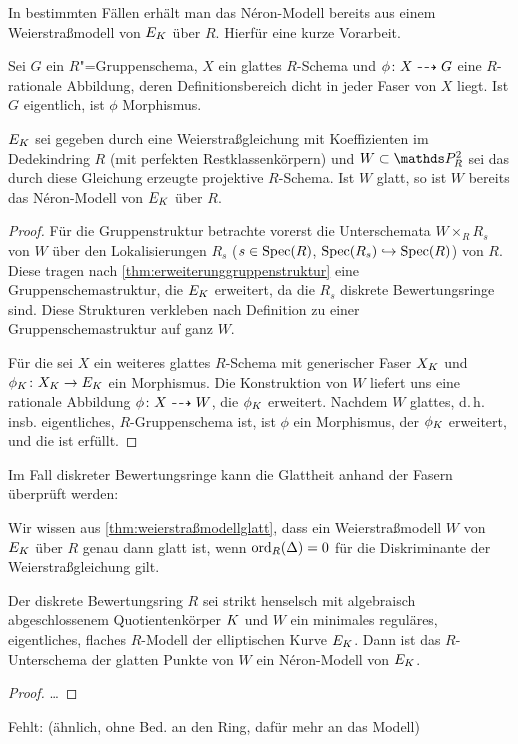 \documentclass[german]{scrreprt}
\begin{document}
In bestimmten Fällen erhält man das Néron-Modell bereits aus einem
Weierstraßmodell von $E_{K}$ über $R$. Hierfür eine kurze Vorarbeit.
\begin{Lemma}\label{thm:rationalzumorphismus}
  Sei $G$ ein $R$"=Gruppenschema, $X$ ein glattes $R$-Schema und
  $\phi\colon X\dashrightarrow G$ eine $R$-rationale Abbildung, deren
  Definitionsbereich dicht in jeder Faser von $X$ liegt.
  Ist $G$ eigentlich, ist $\phi$ Morphismus.
  \cite[Proposition IV.6.2]{silverman2}
\end{Lemma}
\begin{Korollar}\label{thm:neronmausweierstrassgl}
  $E_{K}$ sei gegeben durch eine Weierstraßgleichung mit
  Koeffizienten im Dedekindring $R$ (mit perfekten Restklassenkörpern)
  und $W\subset\P_R^2$ sei das durch diese Gleichung erzeugte projektive
  $R$-Schema.
  Ist $W$ glatt, so ist $W$ bereits das Néron-Modell von $E_{K}$ über
  $R$.
  \cite[Corollary IV.6.3]{silverman2}
  \begin{proof}
    Für die Gruppenstruktur betrachte vorerst die Unterschemata
    $W\times_R R_s$ von $W$ über den Lokalisierungen
    $R_s$ ($s\in\operatorname{Spec}(R)$, $\operatorname{Spec}(R_s)\hookrightarrow\operatorname{Spec}(R)$) von $R$.
    Diese tragen nach \autoref{thm:erweiterunggruppenstruktur} eine
    Gruppenschemastruktur, die $E_{K}$ erweitert, da die $R_s$ diskrete
    Bewertungsringe sind.
    Diese Strukturen verkleben nach Definition zu einer
    Gruppenschemastruktur auf ganz $W$.

    Für die \NAbbEig sei $X$ ein weiteres glattes $R$-Schema mit
    generischer Faser $X_{K}$ und $\phi_{K}\colon X_{K}\to E_{K}$ ein
    Morphismus.
    Die Konstruktion von $W$ liefert uns eine rationale Abbildung
    $\phi\colon X\dashrightarrow W$, die $\phi_{K}$ erweitert.
    Nachdem $W$ glattes, d.\,h. insb. eigentliches, $R$-Gruppenschema
    ist, ist $\phi$ ein Morphismus, der $\phi_{K}$ erweitert, und die
    \NAbbEig ist erfüllt.
  \end{proof}
\end{Korollar}
Im Fall diskreter Bewertungsringe kann die Glattheit anhand der Fasern
überprüft werden:
\begin{Bemerkung}
  Wir wissen aus \autoref{thm:weierstraßmodellglatt},
  dass ein Weierstraßmodell $W$ von $E_{K}$ über $R$ genau dann glatt
  ist, wenn $\operatorname{ord}_R(\Delta)=0$ für die Diskriminante der
  Weierstraßgleichung gilt.
\end{Bemerkung}

\begin{Satz}
  Der diskrete Bewertungsring $R$ sei strikt henselsch mit algebraisch
  abgeschlossenem Quotientenkörper $K$ und
  $W$ ein minimales reguläres, eigentliches, flaches $R$-Modell der
  elliptischen Kurve $E_{K}$.
  Dann ist das $R$-Unterschema der glatten Punkte von $W$ ein
  Néron-Modell von $E_{K}$.
  \cite[1.5, Proposition 1, S.\,21]{neron}
  \begin{proof}
    …
  \end{proof}

  Fehlt: \cite[Theorem IV.6.1]{silverman2}
  (ähnlich, ohne Bed. an den Ring, dafür mehr an das Modell)
\end{Satz}
\end{document}
